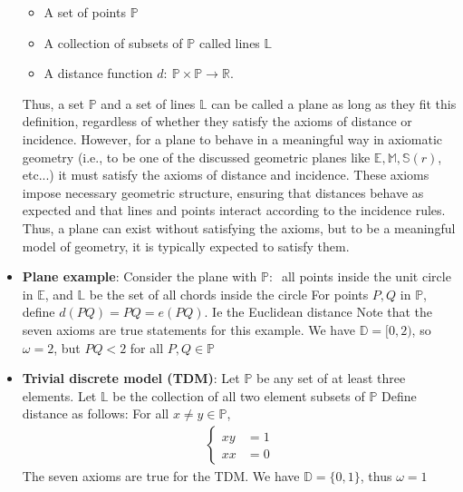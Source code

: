 \documentclass{report}
\begin{document}
\begin{itemize}
\begin{itemize}
            \item A set of points $\mathbb{P}$
            \item A collection of subsets of $\mathbb{P}$ called lines $\mathbb{L}$
            \item A distance function $d:\ \mathbb{P}\times\mathbb{P}\to\mathbb{R}$.
        \end{itemize}
        \bigbreak \noindent 
        Thus, a set $\mathbb{P}$ and a set of lines $\mathbb{L}$ can be called a plane as long as they fit this definition, regardless of whether they satisfy the axioms of distance or incidence.
        \bigbreak \noindent 
        However, for a plane to behave in a meaningful way in axiomatic geometry (i.e., to be one of the discussed geometric planes like $\mathbb{E}, \mathbb{M}, \mathbb{S}(r)$, etc...) it must satisfy the axioms of distance and incidence. These axioms impose necessary geometric structure, ensuring that distances behave as expected and that lines and points interact according to the incidence rules.
        \bigbreak \noindent 
        Thus, a plane can exist without satisfying the axioms, but to be a meaningful model of geometry, it is typically expected to satisfy them.
    \item \textbf{Plane example}: Consider the plane with $\mathbb{P}:\ $ all points inside the unit circle in $\mathbb{E}$, and $\mathbb{L}$ be the set of all chords inside the circle
        \bigbreak \noindent 
        For points $P,Q$ in $\mathbb{P}$, define $d(PQ) = PQ = e(PQ)$. Ie the Euclidean distance
        \bigbreak \noindent 
        Note that the seven axioms are true statements for this example. 
        \bigbreak \noindent 
        We have $\mathbb{D} = [0,2)$, so $\omega = 2$, but $PQ < 2$ for all $P,Q\in \mathbb{P}$
    \item \textbf{Trivial discrete model (TDM)}: Let $\mathbb{P}$ be any set of at least three elements. Let $\mathbb{L}$ be the collection of all two element subsets of $\mathbb{P} $
        \bigbreak \noindent 
        Define distance as follows: For all $x\ne y \in \mathbb{P}$, 
        \begin{align*}
            \begin{cases}
                xy &= 1 \\
                xx &= 0
            \end{cases}
        \end{align*}
        The seven axioms are true for the TDM. We have $\mathbb{D} = \{0,1\}$, thus $\omega = 1 $
        \bigbreak \noindent 

\end{itemize}
\end{document}
